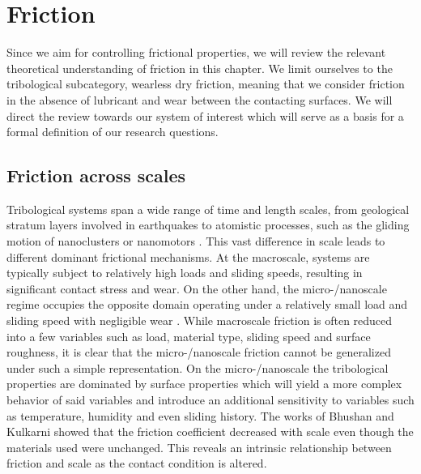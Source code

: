 
\chapter{Friction}\label{chap:friction} 
Since we aim for controlling frictional properties, we will review the relevant theoretical understanding of friction in this chapter. We limit ourselves to the tribological subcategory, wearless dry friction, meaning that we consider friction in the absence of lubricant and wear between the contacting surfaces. We will direct the review towards our system of interest which will serve as a basis for a formal definition of our research questions.



\section{Friction across scales}
Tribological systems span a wide range of time and length scales, from
geological stratum layers involved in earthquakes \cite{kim_nano-scale_2009} to
atomistic processes, such as the gliding motion of nanoclusters or nanomotors
\cite{Manini_2016}. This vast difference in scale leads to different dominant
frictional mechanisms. At the macroscale, systems are typically subject to
relatively high loads and sliding speeds, resulting in significant contact
stress and wear. On the other hand, the micro-/nanoscale regime occupies the
opposite domain operating under a relatively small load and sliding speed with
negligible wear \cite{kim_nano-scale_2009} \cite[p. 5]{bhushan_2013}. While
macroscale friction is often reduced into a few variables such as load, material
type, sliding speed and surface roughness, it is clear that the micro-/nanoscale
friction cannot be generalized under such a simple representation. On the
micro-/nanoscale the tribological properties are dominated by surface properties
which will yield a more complex behavior of said variables and introduce an
additional sensitivity to variables such as temperature, humidity and even
sliding history. The works of Bhushan and Kulkarni \cite{BHUSHAN199649} showed
that the friction coefficient decreased with scale even though the materials
used were unchanged. This reveals an intrinsic relationship between friction and
scale as the contact condition is altered.



